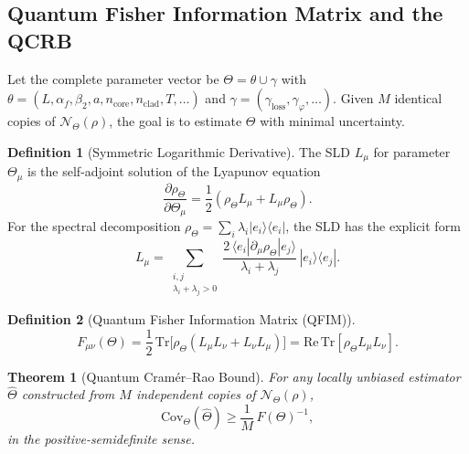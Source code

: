 \documentclass[journal,twocolumn]{IEEEtran}
\theoremstyle{definition}
\newtheorem{definition}{Definition}[section]
\theoremstyle{plain}
\newtheorem{theorem}{Theorem}[section]
\newcommand{\Tr}{\mathrm{Tr}}
\newcommand{\alphaf}{\alpha_{f}}
\begin{document}
\subsection{Quantum Fisher Information Matrix and the QCRB}

Let the complete parameter vector be $\Theta = \theta \cup \gamma$
with $\theta = (L,\alphaf,\beta_2,a,n_{\mathrm{core}},
n_{\mathrm{clad}},T,\ldots)$ and $\gamma = (\gamma_{\mathrm{loss}},
\gamma_\varphi, \ldots)$.  Given $M$ identical copies of
$\mathcal{N}_\Theta(\rho)$, the goal is to estimate $\Theta$ with
minimal uncertainty.

\begin{definition}[Symmetric Logarithmic Derivative]
The SLD $L_\mu$ for parameter $\Theta_\mu$ is the self-adjoint
solution of the Lyapunov equation
\begin{equation}
  \frac{\partial \rho_\Theta}{\partial \Theta_\mu}
  = \frac{1}{2}(\rho_\Theta L_\mu + L_\mu \rho_\Theta).
  \label{eq:sld_def}
\end{equation}
For the spectral decomposition $\rho_\Theta =
\sum_i \lambda_i |e_i\rangle\langle e_i|$, the SLD has the explicit form
\begin{equation}
  L_\mu = \sum_{\substack{i,j \\ \lambda_i + \lambda_j > 0}}
  \frac{2\,\langle e_i|\partial_\mu\rho_\Theta|e_j\rangle}
       {\lambda_i + \lambda_j}\,|e_i\rangle\langle e_j|.
  \label{eq:SLD}
\end{equation}
\end{definition}

\begin{definition}[Quantum Fisher Information Matrix (QFIM)]
\label{def:qfim}
\begin{equation}
  F_{\mu\nu}(\Theta) = \frac{1}{2}\,\Tr\bigl[\rho_\Theta
    (L_\mu L_\nu + L_\nu L_\mu)\bigr]
  = \mathrm{Re}\,\Tr[\rho_\Theta L_\mu L_\nu].
  \label{eq:QFIM}
\end{equation}
\end{definition}

\begin{theorem}[Quantum Cram\'{e}r--Rao Bound]
\label{thm:QCRB}
For any locally unbiased estimator $\hat\Theta$ constructed from
$M$ independent copies of $\mathcal{N}_\Theta(\rho)$,
\begin{equation}
  \mathrm{Cov}_\Theta(\hat\Theta) \ge \frac{1}{M}\,F(\Theta)^{-1},
  \label{eq:QCRB}
\end{equation}
in the positive-semidefinite sense.
\end{theorem}
\end{document}
